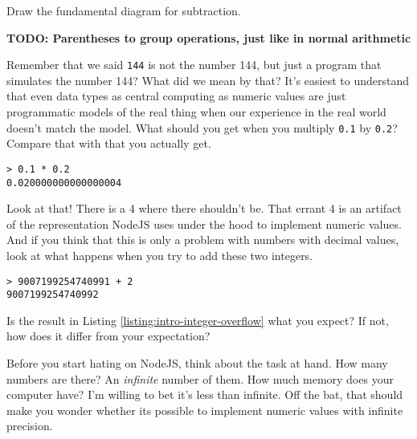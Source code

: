 \begin{question}
  Draw the fundamental diagram for subtraction.
\end{question}

\begin{center}
\textbf{TODO: Parentheses to group operations, just like in normal arithmetic}
\end{center}

Remember that we said \texttt{144} is not the number 144, but just a program that simulates the number 144? What did we mean by that? It's easiest to understand that even data types as central computing as numeric values are just programmatic models of the real thing when our experience in the real world doesn't match the model. What should you get when you multiply \texttt{0.1} by \texttt{0.2}? Compare that with that you actually get.

\begin{lstlisting}
> 0.1 * 0.2
0.020000000000000004
\end{lstlisting}

Look at that! There is a 4 where there shouldn't be. That errant 4 is an artifact of the representation NodeJS uses under the hood to implement numeric values. And if you think that this is only a problem with numbers with decimal values, look at what happens when you try to add these two integers.

\begin{lstlisting}[caption={\label{listing:intro-integer-overflow} The limitations of finite memory.}]
> 9007199254740991 + 2
9007199254740992
\end{lstlisting}

\begin{question}
  Is the result in Listing \ref{listing:intro-integer-overflow} what you expect? If not, how does it differ from your expectation?
\end{question}

Before you start hating on NodeJS, think about the task at hand. How many numbers are there? An \emph{infinite} number of them. How much memory does your computer have? I'm willing to bet it's less than infinite. Off the bat, that should make you wonder whether its possible to implement numeric values with infinite precision.

